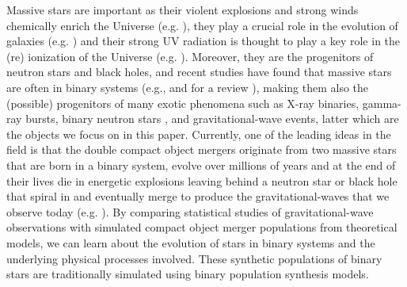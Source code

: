 \documentclass[a4paper,fleqn,usenatbib]{mnras}
\begin{document}
Massive stars are important as their violent explosions and strong winds chemically enrich the Universe (e.g. \citealt{woosley2007nucleosynthesis}), they play a crucial role in the evolution of galaxies (e.g. \citealt{hopkins2014galaxies}) and their strong UV radiation is thought to play a key role in the (re) ionization of the Universe (e.g. \citealt{bromm2011first}). 
Moreover,  they are the progenitors of neutron stars and black holes, and recent studies have found that massive stars are often in binary systems (e.g., \citealt{kobulnicky2007new,mason2009high, sana2012binary,kiminki2012updated, kobulnicky2014toward, almeida2017tarantula, chini2012spectroscopic} and for a review \citealt{de2017dawes}), making them also the (possible) progenitors of many exotic phenomena such as X-ray binaries, gamma-ray bursts, binary neutron stars \citep{hulse1975discovery}, and  gravitational-wave events, latter which are the objects we focus on in this paper.
%
%
% 
Currently, one of the leading ideas in the field is that the double compact object mergers  originate from two massive stars that are born in a binary system, evolve over millions of years and at the end of their lives die in energetic explosions leaving behind a neutron star or black hole that spiral in and eventually merge to produce the gravitational-waves that we observe today (e.g. \citealt{belczynski2017gw170104, tauris2017formation, stevenson2017formation}). By comparing statistical studies of gravitational-wave observations with simulated compact object merger populations from theoretical models, we can learn about the evolution of stars in binary systems and the underlying physical processes involved. These synthetic populations of binary stars are traditionally simulated using binary population synthesis models. 
%
\end{document}
